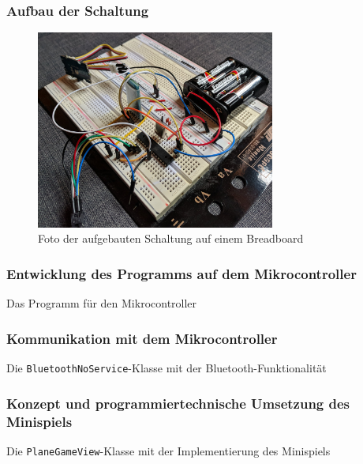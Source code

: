 \setcounter{subsection}{4}
\setcounter{subsubsection}{0}
\tocless\subsubsection{Aufbau der Schaltung}
\begin{figure}[H]
	\centering
	\includegraphics[width=0.7\textwidth]{pics/mikrocontroller.jpg}
	\caption{Foto der aufgebauten Schaltung auf einem Breadboard}
	\label{fig:pianostairs}
\end{figure}
\tocless\subsubsection{Entwicklung des Programms auf dem Mikrocontroller}
\renewcommand{\listingscaption}{Quellcode}
 \begin{longlisting}
 \caption{Das Programm für den Mikrocontroller}
 \label{listing:mikrocontroller}
 \end{longlisting}
 
\setcounter{subsection}{5}
\setcounter{subsubsection}{1}
\tocless\subsubsection{Kommunikation mit dem Mikrocontroller}
\begin{longlisting}
	\caption{Die \texttt{BluetoothNoService}-Klasse mit der Bluetooth-Funktionalität}
	\label{listing:bluetooth}
\end{longlisting}

\tocless\subsubsection{Konzept und programmiertechnische Umsetzung des Minispiels}
\begin{longlisting}
	\caption{Die \texttt{PlaneGameView}-Klasse mit der Implementierung des Minispiels}
	\label{listing:game}
\end{longlisting}

